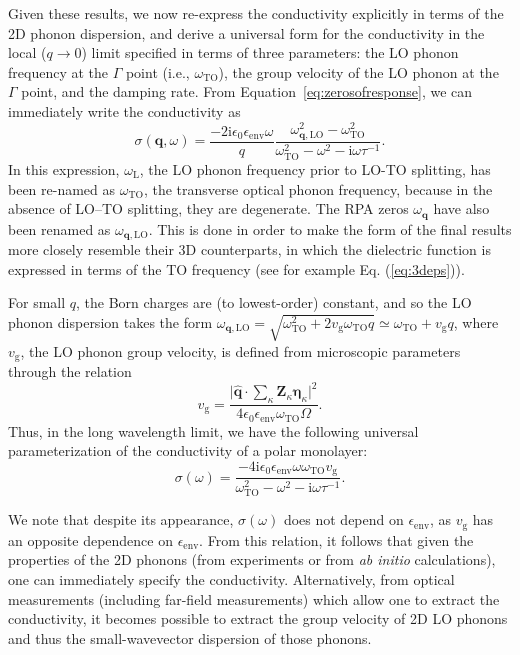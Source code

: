 \documentclass[aps,prb,twocolumn,
	           groupedaddress,superscriptaddress,
               amsfonts,amssymb,amsmath,floatfix,
	           citeautoscript]{revtex4-1}
\newcommand{\iu}{\mathrm{i}}
\begin{document}
Given these results, we now re-express the conductivity explicitly in terms of the 2D phonon dispersion, and derive a universal form for the conductivity in the local ($q\rightarrow 0$) limit specified in terms of three parameters: the LO phonon frequency at the $\Gamma$ point (i.e., $\omega_{\mathrm{TO}}$), the group velocity of the LO phonon at the $\Gamma$ point, and the damping rate. From Equation~\eqref{eq:zerosofresponse}, we can immediately write the conductivity as
  \begin{equation}
  \sigma(\mathbf{q},\omega) = \frac{-2\iu\epsilon_0\epsilon_{\mathrm{env}}\omega}{q}\frac{\omega^2_{\mathbf{q},\mathrm{LO}}-\omega^2_{\mathrm{TO}}}{\omega^2_{\mathrm{TO}}-\omega^2-\iu\omega\tau^{-1}}.
  \end{equation}
 In this expression, $\omega_\mathrm{L}$, the LO phonon frequency prior to LO-TO splitting, has been re-named as $\omega_{\mathrm{TO}}$, the transverse optical phonon frequency, because in the absence of LO--TO splitting, they are degenerate. The RPA zeros $\omega_{\mathbf{q}}$ have also been renamed as $\omega_{\mathbf{q},\mathrm{LO}}$. This is done in order to make the form of the final results more closely resemble their 3D counterparts, in which the dielectric function is expressed in terms of the TO frequency (see for example Eq. (\ref{eq:3deps})). 
 
 For small $q$,  the Born charges are (to lowest-order) constant, and so the LO phonon dispersion takes the form $\omega_{\mathbf{q},\mathrm{LO}}=\sqrt{\omega^2_{\mathrm{TO}}+2v_{\mathrm{g}}\omega_{\mathrm{TO}}q} \simeq \omega_{\mathrm{TO}} + v_{\mathrm{g}}q$, where $v_{\mathrm{g}}$, the LO phonon group velocity, is defined from microscopic parameters through the relation
 \begin{equation}
    v_{\mathrm{g}} = \frac{\Big|\hat{\mathbf{q}}\cdot \sum_\kappa \mathbf{Z}_\kappa\boldsymbol{\eta}_\kappa\Big|^2 }{4\epsilon_0 \epsilon_{\mathrm{env}}\omega_{\mathrm{TO}}\Omega}. 
\end{equation}
Thus, in the long wavelength limit, we have the following universal parameterization of the conductivity of a polar monolayer:
\begin{equation}
    \sigma(\omega) =  \frac{-4\iu\epsilon_0\epsilon_{\mathrm{env}}\omega\omega_{\mathrm{TO}}v_{\mathrm{g}}}{\omega^2_{\mathrm{TO}}-\omega^2-\iu\omega\tau^{-1}}.
    \label{eq:localsigma}
\end{equation}

We note that despite its appearance, $\sigma(\omega)$ does not depend on $\epsilon_{\mathrm{env}}$, as $v_{\mathrm{g}}$ has an opposite dependence on $\epsilon_{\mathrm{env}}$. From this relation, it follows that given the properties of the 2D phonons (from experiments or from \emph{ab initio} calculations), one can immediately specify the conductivity. Alternatively, from optical measurements (including far-field measurements) which allow one to extract the conductivity, it becomes possible to extract the group velocity of 2D LO phonons and thus the small-wavevector dispersion of those phonons. 
  
\end{document}

